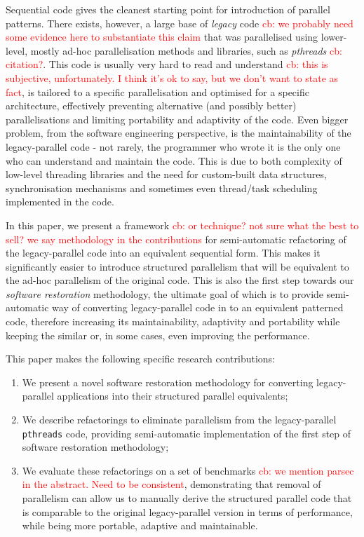 Sequential code gives the cleanest starting point for introduction of parallel patterns. There exists, however, a large base of \emph{legacy} code \textcolor{red}{cb: we probably need some evidence here to substantiate this claim} that was parallelised using lower-level, mostly ad-hoc parallelisation methods and libraries, such as \emph{pthreads} \textcolor{red}{cb: citation?}. This code is usually very hard to read and understand \textcolor{red}{cb: this is subjective, unfortunately. I think it's ok to say, but we don't want to state as fact}, is tailored to a specific parallelisation and optimised for a specific architecture, effectively preventing alternative (and possibly better) parallelisations and limiting portability and adaptivity of the code. Even bigger problem, from the software engineering perspective, is the maintainability of the legacy-parallel code - not rarely, the programmer who wrote it is the only one who can understand and maintain the code. This is due to both complexity of low-level threading libraries and the need for custom-built data structures, synchronisation mechanisms and sometimes even thread/task scheduling implemented in the code. 
  
In this paper, we present a framework \textcolor{red}{cb: or technique? not sure what the best to sell? we say methodology in the contributions} for semi-automatic refactoring of the legacy-parallel code into an equivalent sequential form. This makes it significantly easier to introduce structured parallelism that will be equivalent to the ad-hoc parallelism of the original code. This is also the first step towards our \emph{software restoration} methodology, the ultimate goal of which is to provide semi-automatic way of converting legacy-parallel code in to an equivalent patterned code, therefore increasing its maintainability, adaptivity and portability while keeping the similar or, in some cases, even improving the performance. 

This paper makes the following specific research contributions:
\begin{enumerate}
    \item We present a novel software restoration methodology for converting legacy-parallel applications into their structured parallel equivalents;
    \item We describe refactorings to eliminate parallelism from the legacy-parallel \lstinline{pthreads} code, providing semi-automatic implementation of the first step of software restoration methodology;
    \item We evaluate these refactorings on a set of benchmarks \textcolor{red}{cb: we mention parsec in the abstract. Need to be consistent}, demonstrating that removal of parallelism can allow us to manually derive the structured parallel code that is comparable to the original legacy-parallel version in terms of performance, while being more portable, adaptive and maintainable.
\end{enumerate}

